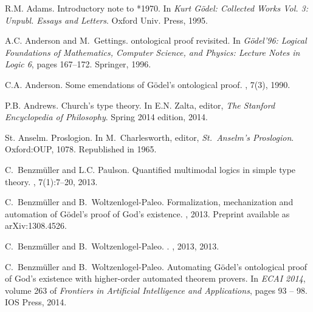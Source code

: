 \documentclass{article}
\begin{document}

\small

%

\begin{thebibliography}{}

R.M. Adams.
\newblock Introductory note to *1970.
\newblock In {\em {Kurt G\"odel: Collected Works Vol. 3: Unpubl. Essays and
  Letters}}. Oxford Univ. Press, 1995.

A.C. Anderson and M.~Gettings.
 ontological proof revisited.
\newblock In {\em {G\"odel'96: Logical Foundations of Mathematics, Computer
  Science, and Physics: Lecture Notes in Logic 6}}, pages 167--172. {Springer},
  1996.

C.A. Anderson.
\newblock Some emendations of {G{\"o}del's} ontological proof.
, 7(3), 1990.

P.B. Andrews.
\newblock Church's type theory.
\newblock In E.N. Zalta, editor, {\em The Stanford Encyclopedia of Philosophy}.
  Spring 2014 edition, 2014.

St. Anselm.
\newblock Proslogion.
\newblock In M.~Charlesworth, editor, {\em St.~Anselm's Proslogion}.
  Oxford:OUP, 1078.
\newblock Republished in 1965.

C.~Benzm{\"u}ller and L.C. Paulson.
\newblock Quantified multimodal logics in simple type theory.
, 7(1):7--20, 2013.

C.~Benzm{\"u}ller and B.~Woltzenlogel-Paleo.
\newblock Formalization, mechanization and automation of {G{\"o}del's} proof of
  {God's} existence.
, 2013.
\newblock Preprint available as arXiv:1308.4526.

C.~Benzm\"uller and B.~Woltzenlogel-Paleo.
.
, 2013, 2013.

C.~Benzm{\"u}ller and B.~Woltzenlogel-Paleo.
\newblock Automating {G\"{o}del's} ontological proof of {God}'s existence with
  higher-order automated theorem provers.
\newblock In 
  {\em ECAI 2014}, volume 263 of {\em Frontiers in Artificial Intelligence and
  Applications}, pages 93 -- 98. IOS Press, 2014.


\end{thebibliography}
\end{document}
